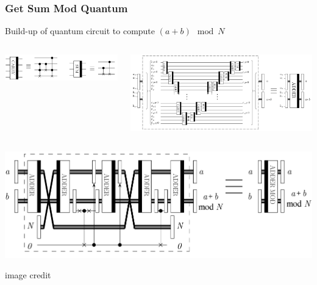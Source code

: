 \documentclass[handout]{beamer}
\begin{document}
\begin{frame}
  \frametitle{Get Sum Mod Quantum}
  Build-up of quantum circuit to compute $(a+b) \mod N$
  \begin{columns}
    \includegraphics[width=0.95\linewidth]{Graphics/Q-Arithmetic-SUM-and-CARRY.png}

    \includegraphics[width=0.95\linewidth]{Graphics/Q-Arithmetic-ADDER.png}
  \end{columns}
  
  \includegraphics[width=0.75\linewidth]{Graphics/Q-Arithmetic-ADDERMOD.png}

  image credit~\cite{arXiv:9511018}
\end{frame}
\end{document}
